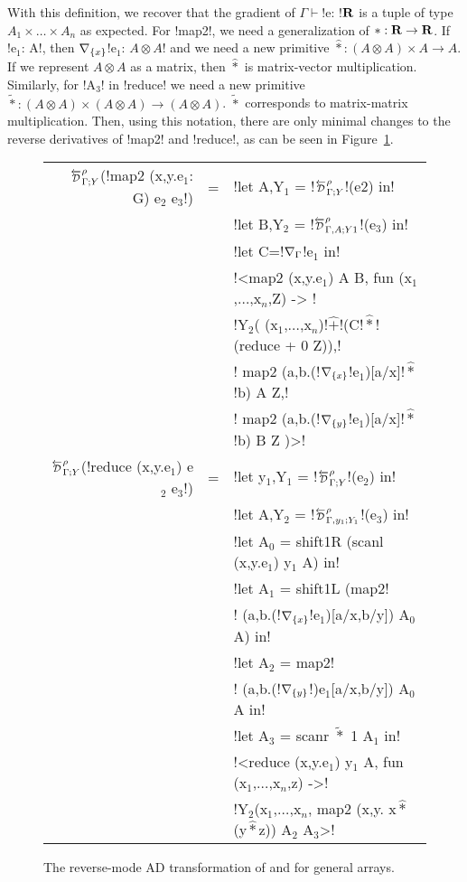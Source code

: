 With this definition, we recover that the gradient of $\Gamma \vdash$!e: !$\mathbf{R}$ is a tuple of type $A_1\times\ldots\times A_n$ as expected.
For !map2!, we need a generalization of $*:\mathbf{R}\to\mathbf{R}$. 
If !e$_1$: A!, then $\nabla_{\{x\}}$!e$_1$: $A\otimes A$! and we need a new primitive $\widehat{*}:(A\otimes A) \times A \to A$.
If we represent $A\otimes A$ as a matrix, then $\widehat{*}$ is matrix-vector multiplication.
Similarly, for !A$_{3}$! in !reduce! we need a new primitive $\widetilde{*}:(A\otimes A)\times(A\otimes A) \to (A\otimes A)$.
$\widetilde{*}$ corresponds to matrix-matrix multiplication.
Then, using this notation, there are only minimal changes to the reverse derivatives of !map2! and !reduce!, as can be seen in Figure~\ref{fig:lift_gen_arr}.

\begin{figure}
\begin{center}
\begin{tabular}{|r c l|}
\hline
    $\directD{\rho}{\Gamma}{Y}$(!map2 (x,y.e$_1$: G) e$_2$ e$_3$!) &=&  
    !let A,Y$_1$ = !$\directD{\rho}{\Gamma}{Y}$!(e2) in! \\
    && !let B,Y$_2$ = !$\directD{\rho}{\Gamma,A}{Y1}$!(e$_3$) in! \\
    && !let C=!$\nabla_{\Gamma}$!e$_1$ in!\\
    && !<map2 (x,y.e$_1$) A B, fun (x$_1$,$\ldots$,x$_n$,Z) -> !\\
    && !Y$_2$( (x$_1$,$\ldots$,x$_n$)!$\widehat{+}$!(C!$\widehat{*}$!(reduce + 0 Z)),!\\
    && \quad\quad! map2 (a,b.(!$\nabla_{\{x\}}$!e$_1$)[a/x]!$\widehat{*}$!b) A Z,!\\
    && \quad\quad! map2 (a,b.(!$\nabla_{\{y\}}$!e$_1$)[a/x]!$\widehat{*}$!b) B Z )>!\\
    $\directD{\rho}{\Gamma}{Y}$(!reduce (x,y.e$_{1}$) e$_{2}$ e$_{3}$!) &=&
    !let y$_{1}$,Y$_{1}$ = !$\directD{\rho}{\Gamma}{Y}$!(e$_{2}$) in! \\
    && !let A,Y$_{2}$ = !$\directD{\rho}{\Gamma,y_1}{Y_1}$!(e$_{3}$) in! \\
    && !let A$_{0}$ = shift1R (scanl (x,y.e$_{1}$) y$_{1}$ A) in! \\
    && !let A$_{1}$ = shift1L (map2! \\ 
    && !      (a,b.(!$\nabla_{\{x\}}$!e$_{1}$)[a/x,b/y]) A$_{0}$ A) in! \\
    && !let A$_{2}$ = map2! \\
    && !      (a,b.(!$\nabla_{\{y\}}$!)e$_{1}$[a/x,b/y]) A$_{0}$ A in! \\
    && !let A$_{3}$ = scanr $\widetilde{*}$ 1 A$_{1}$ in! \\
    && !<reduce (x,y.e$_{1}$) y$_{1}$ A, fun (x$_{1}$,$\ldots$,x$_n$,z) ->! \\
    && !Y$_{2}$(x$_{1}$,$\ldots$,x$_n$, map2 (x,y. x$\widehat{*}$(y$\widehat{*}$z)) A$_{2}$ A$_{3}$>! \\ \hline
\end{tabular}
\end{center}
\caption{The reverse-mode AD transformation of  and  for general arrays.}
\label{fig:lift_gen_arr}
\end{figure}

